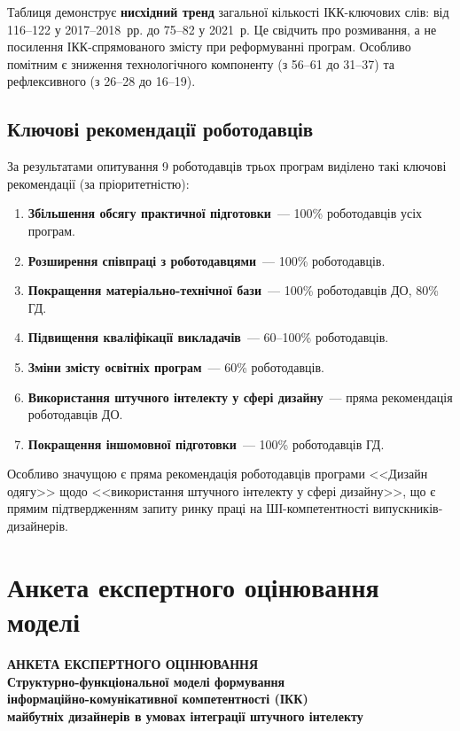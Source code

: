 Таблиця демонструє \textbf{нисхідний тренд} загальної кількості ІКК-ключових слів: від 116--122 у 2017--2018~рр. до 75--82 у 2021~р. Це свідчить про розмивання, а не посилення ІКК-спрямованого змісту при реформуванні програм. Особливо помітним є зниження технологічного компоненту (з 56--61 до 31--37) та рефлексивного (з 26--28 до 16--19).

\subsection{Ключові рекомендації роботодавців}

За результатами опитування 9 роботодавців трьох програм виділено такі ключові рекомендації (за пріоритетністю):

\begin{enumerate}
    \item \textbf{Збільшення обсягу практичної підготовки}~--- 100\% роботодавців усіх програм.
    \item \textbf{Розширення співпраці з роботодавцями}~--- 100\% роботодавців.
    \item \textbf{Покращення матеріально-технічної бази}~--- 100\% роботодавців ДО, 80\% ГД.
    \item \textbf{Підвищення кваліфікації викладачів}~--- 60--100\% роботодавців.
    \item \textbf{Зміни змісту освітніх програм}~--- 60\% роботодавців.
    \item \textbf{Використання штучного інтелекту у сфері дизайну}~--- пряма рекомендація роботодавців ДО.
    \item \textbf{Покращення іншомовної підготовки}~--- 100\% роботодавців ГД.
\end{enumerate}

Особливо значущою є пряма рекомендація роботодавців програми <<Дизайн одягу>> щодо <<використання штучного інтелекту у сфері дизайну>>, що є прямим підтвердженням запиту ринку праці на ШІ-компетентності випускників-дизайнерів.

\clearpage

\section{Анкета експертного оцінювання моделі}\label{app:expert-survey}

\begin{center}
\textbf{АНКЕТА ЕКСПЕРТНОГО ОЦІНЮВАННЯ}\\[0.3cm]
\textbf{Структурно-функціональної моделі формування}\\
\textbf{інформаційно-комунікативної компетентності (ІКК)}\\
\textbf{майбутніх дизайнерів в умовах інтеграції штучного інтелекту}\\[0.5cm]
\end{center}

